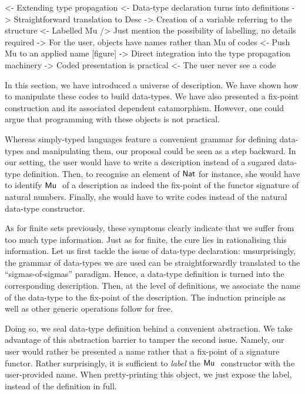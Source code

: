 
\begin{wstructure}
<- Extending type propagation
    <- Data-type declaration turns into definitions
        -> Straightforward translation to Desc
        -> Creation of a variable referring to the structure
    <- Labelled Mu
        /> Just mention the possibility of labelling, no details required
        -> For the user, objects have names rather than Mu of codes
    <- Push Mu to an applied name [figure]
        -> Direct integration into the type propagation machinery
    -> Coded presentation is practical
        <- The user never see a code
\end{wstructure}


In this section, we have introduced a universe of description. We have
shown how to manipulate these codes to build data-types. We have also
presented a fix-point construction and its associated dependent
catamorphism. However, one could argue that programming with these
objects is not practical. 

Whereas simply-typed languages feature a convenient grammar for
defining data-types and manipulating them, our proposal could be seen
as a step backward. In our setting, the user would have to write a
description instead of a sugared data-type definition. Then, to
recognise an element of $\Nat$ for instance, she would have to
identify $\Mu{}$ of a description as indeed the fix-point of the
functor signature of natural numbers. Finally, she would have to write
codes instead of the natural data-type constructor.

As for finite sets previously, these symptoms clearly indicate that we
suffer from too much type information. Just as for finite, the cure
lies in rationalising this information. Let us first tackle the issue
of data-type declaration: unsurprisingly, the grammar of data-types we
are used can be straightforwardly translated to the
``sigmas-of-sigmas'' paradigm. Hence, a data-type definition is turned
into the corresponding description. Then, at the level of definitions,
we associate the name of the data-type to the fix-point of the
description. The induction principle as well as other generic
operations follow for free.

Doing so, we seal data-type definition behind a convenient
abstraction. We take advantage of this abstraction barrier to tamper
the second issue. Namely, our user would rather be presented a name
rather that a fix-point of a signature functor. Rather surprisingly,
it is sufficient to \emph{label} the $\Mu{}$ constructor with the
user-provided name. When pretty-printing this object, we just expose
the label, instead of the definition in full.

